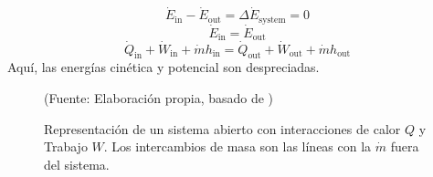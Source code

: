 \begin{equation}
	\dot{E}_{\text{in}} - \dot{E}_{\text{out}} = \Delta \dot{E}_{\text{system}} = 0
\end{equation}
\begin{equation}
	\dot{E}_{\text{in}} = \dot{E}_{\text{out}}
\end{equation}
\begin{equation}
	\dot{Q}_{\text{in}} + \dot{W}_{\text{in}} + \dot{m}h_{\text{in}} = \dot{Q}_{\text{out}} + \dot{W}_{\text{out}} + \dot{m}h_{\text{out}}
\end{equation}
Aquí, las energías cinética y potencial son despreciadas.


\begin{figure}[H]
	\centering
	\caption{Representación de un sistema abierto con interacciones de calor $Q$ y Trabajo $W$. Los intercambios de masa son las líneas con la $\dot{m}$ fuera del sistema. }(Fuente: Elaboración propia, basado de \cite{james-2013})
	\label{fig:sistema_abierto}
\end{figure}


